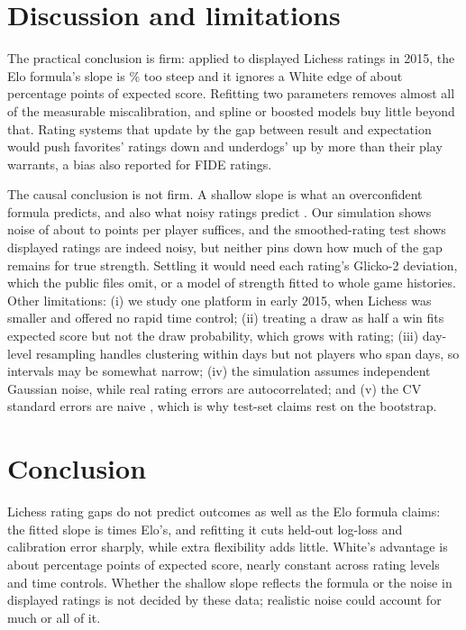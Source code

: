 \documentclass{article}
\begin{document}
\section{Discussion and limitations}
\label{sec:discussion}

The practical conclusion is firm: applied to displayed Lichess ratings in 2015, the Elo formula's slope is \slopeGapPct\% too steep and it ignores a White edge of about \advScorePct{} percentage points of expected score. Refitting two parameters removes almost all of the measurable miscalibration, and spline or boosted models buy little beyond that. Rating systems that update by the gap between result and expectation would push favorites' ratings down and underdogs' up by more than their play warrants, a bias \citet{sonas2011} also reported for FIDE ratings.

The causal conclusion is not firm. A shallow slope is what an overconfident formula predicts, and also what noisy ratings predict \citep{carroll2006}. Our simulation shows noise of about \simSigmaFreq{} to \simSigmaAll{} points per player suffices, and the smoothed-rating test shows displayed ratings are indeed noisy, but neither pins down how much of the gap remains for true strength. Settling it would need each rating's Glicko-2 deviation, which the public files omit, or a model of strength fitted to whole game histories. Other limitations: (i) we study one platform in early 2015, when Lichess was smaller and offered no rapid time control; (ii) treating a draw as half a win fits expected score but not the draw probability, which grows with rating; (iii) day-level resampling handles clustering within days but not players who span days, so intervals may be somewhat narrow; (iv) the simulation assumes independent Gaussian noise, while real rating errors are autocorrelated; and (v) the CV standard errors are naive \citep{bates2024}, which is why test-set claims rest on the bootstrap.

\section{Conclusion}
\label{sec:conclusion}

Lichess rating gaps do not predict outcomes as well as the Elo formula claims: the fitted slope is \slopeRatio{} times Elo's, and refitting it cuts held-out log-loss and calibration error sharply, while extra flexibility adds little. White's advantage is about \advScorePct{} percentage points of expected score, nearly constant across rating levels and time controls. Whether the shallow slope reflects the formula or the noise in displayed ratings is not decided by these data; realistic noise could account for much or all of it.
\end{document}
